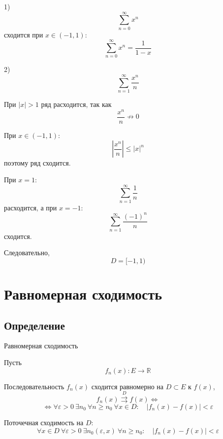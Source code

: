 \documentclass[12pt,a4paper]{article}
\begin{document}
\begin{example}

    1)
    \[
        \sum_{n=0}^{\infty}x^n
    \]
    сходится при $x\in(-1,1)$:
    \[
        \sum_{n=0}^{\infty}x^n=\frac{1}{1-x}
    \]

    2)
    \[
        \sum_{n=1}^{\infty}\frac{x^n}{n}
    \]

    При $|x|>1$ ряд расходится, так как
    \[
        \frac{x^n}{n}\not\to0
    \]

    При $x\in(-1,1)$:
    \[
        \left|\frac{x^n}{n}\right|\leq |x|^n
    \]
    поэтому ряд сходится.

    При $x=1$:
    \[
        \sum_{n=1}^{\infty}\frac{1}{n}
    \]
    расходится, а при $x=-1$:
    \[
        \sum_{n=1}^{\infty}\frac{(-1)^n}{n}
    \]
    сходится.

    Следовательно,
    \[
        D=[-1,1)
    \]

\end{example}

\newpage

\section{Равномерная сходимость}

\subsection{Определение}

\begin{definition}{Равномерная сходимость}

    Пусть
    \[
        f_n(x)\colon E\to\mathbb{R}
    \]

    Последовательность $f_n(x)$ сходится равномерно на $D\subset E$ к $f(x)$,
    \[
        f_n(x)\overset{D}{\rightrightarrows}f(x) \Longleftrightarrow
    \]
    \[
        \Longleftrightarrow\forall\varepsilon>0\ \exists n_0\
        \forall n\geq n_0\
        \forall x\in D:
        \quad
        |f_n(x)-f(x)|<\varepsilon
    \]

\end{definition}

\begin{definition}
    Поточечная сходимость на $D$:
    \[
        \forall x\in D\ \forall\varepsilon>0\ \exists n_0(\varepsilon,x)\
        \forall n\geq n_0:
        \quad
        |f_n(x)-f(x)|<\varepsilon
    \]
\end{definition}
\end{document}
